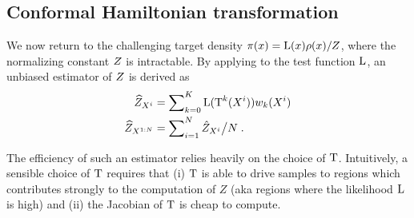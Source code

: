\documentclass{article}
\begin{document}
\subsection{Conformal Hamiltonian transformation}
\label{subsec:NISestimators}
We now return to the challenging target density $\pi(x)= \mathrm{L}(x) \rho(x)/Z$,
where the normalizing constant $Z$ is intractable.
By applying  to
the test function $\mathrm{L}$, an unbiased estimator of $Z$ is derived as
\begin{align}  \label{eq:def_estimator_normal_const_1}
  \widehat{Z}_{X^i}&=\sum\nolimits_{k=0}^K\mathrm{L}(\operatorname{T}^{k}(X^i))w_k(X^i)\\
\label{eq:def_estimator_normal_const}  \widehat{Z}_{X^{1:N}}&=\sum\nolimits_{i=1}^{N} \hat{Z}_{X^i}\big/N \;.
\end{align}

The efficiency of such an estimator relies heavily on the choice of $\operatorname{T}$. Intuitively, a sensible choice of
$\operatorname{T}$ requires that  (i) $\operatorname{T}$ is able to drive samples to regions which contributes strongly to the computation of $Z$ (aka regions where the likelihood $\mathrm{L}$ is high) and (ii) the Jacobian of $\operatorname{T}$ is cheap to compute.
\end{document}
